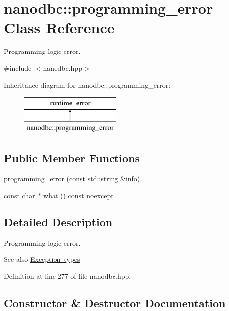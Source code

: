 \hypertarget{classnanodbc_1_1programming__error}{}\section{nanodbc\+::programming\+\_\+error Class Reference}
\label{classnanodbc_1_1programming__error}


Programming logic error.  




{\ttfamily \#include $<$nanodbc.\+hpp$>$}

Inheritance diagram for nanodbc\+::programming\+\_\+error\+:\begin{figure}[H]
\begin{center}
\leavevmode
\includegraphics[height=2.000000cm]{classnanodbc_1_1programming__error}
\end{center}
\end{figure}
\subsection*{Public Member Functions}
\begin{DoxyCompactItemize}
\item 
\mbox{\hyperlink{classnanodbc_1_1programming__error_a9f746c1fdb0ee531b2aff58b55c926f0}{programming\+\_\+error}} (const std\+::string \&info)
\item 
const char $\ast$ \mbox{\hyperlink{classnanodbc_1_1programming__error_a325389a1a3889694e252e8c87b7f3cec}{what}} () const noexcept
\end{DoxyCompactItemize}


\subsection{Detailed Description}
Programming logic error. 

\begin{DoxySeeAlso}{See also}
\mbox{\hyperlink{group__exceptions}{Exception types}} 
\end{DoxySeeAlso}


Definition at line 277 of file nanodbc.\+hpp.



\subsection{Constructor \& Destructor Documentation}
\mbox{\label{classnanodbc_1_1programming__error_a9f746c1fdb0ee531b2aff58b55c926f0}} 
